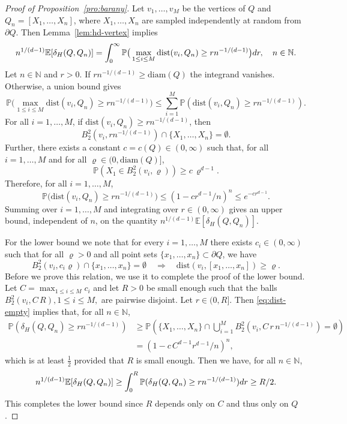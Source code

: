 \documentclass[a4paper,12pt]{article}
\theoremstyle{definition}
\newcommand{\IE}{\mathbb{E}}
\newcommand{\IN}{\mathbb{N}}
\newcommand{\IP}{\mathbb{P}}
\newcommand{\dd}{{\rm d}}
\newcommand{\dist}{\mathrm{dist}}
\newcommand{\diam}{\mathrm{diam}}
\begin{document}
\begin{proof}[Proof of Proposition~\ref{pro:barany}]
Let $v_1,\dots,v_M$ be the vertices of $Q$ and $Q_n=[X_1,\dots,X_n]$, where $X_1,\dots,X_n$ are sampled independently at random from $\partial Q$. Then Lemma~\ref{lem:hd-vertex} implies
\[
n^{1/(d-1)}\IE[\delta_H(Q,Q_n)]
=\int_0^{\infty}\IP\big(\max_{1\le i\le M}\dist(v_i,Q_n)\ge rn^{-1/(d-1)}\big)\dd r,\quad n\in\IN.
\]
Let $n\in\IN$ and $r>0$. If $rn^{-1/(d-1)}\ge \diam(Q)$ the integrand vanishes. Otherwise, a union bound gives
\[
\IP\big(\max_{1\le i\le M}\dist(v_i,Q_n)\ge rn^{-1/(d-1)}\big)
\le \sum_{i=1}^{M}\IP(\dist(v_i,Q_n)\ge rn^{-1/(d-1)}).
\]
For all $i=1,\dots,M$, if $\dist(v_i,Q_n)\ge rn^{-1/(d-1)}$, then 
  \[
    B^2_2(v_i,rn^{-1/(d-1)})\cap \{X_1,\dots,X_n\}=\emptyset.
  \] 
	Further, there exists a constant $c=c(Q)\in (0,\infty)$ such that, for all $i=1,\dots,M$ and for all $\varrho\in (0,\diam(Q)]$, 
\begin{equation} \label{eq:volume-ball}
\IP(X_1\in B^2_2(v_i,\varrho))\ge c\, \varrho^{d-1}.
\end{equation}
Therefore, for all $i=1,\dots,M$, 
\begin{equation}\label{Prop1}
\IP\big(\dist(v_{i},Q_n)\ge rn^{-1/(d-1)}\big)\le (1-cr^{d-1}/n)^n\le e^{-cr^{d-1}}.
\end{equation}
Summing over $i=1,\dots,M$ and integrating over $r\in (0,\infty)$ gives an upper bound, independent of $n$, on the quantity $n^{1/(d-1)}\IE[ \delta_H(Q,Q_n)]$.

For the lower bound we note that for every $i=1,\dots,M$ there exists $c_i\in (0,\infty)$ such that for all $\varrho>0$ and all point sets $\{x_1,\dots,x_n\}\subset \partial Q$, we have
\begin{equation} \label{eq:dist-empty}
	B^2_2(v_i,c_i \varrho)\cap \{x_1,\dots,x_n\}=\emptyset \quad \Rightarrow \quad \dist(v_i,[x_1,\dots,x_n])\ge \varrho.
\end{equation}
Before we prove this relation, we use it to complete the proof of the lower bound. Let $C=\max_{1\le i\le M}c_i$ and let $R>0$ be small enough such that the balls $B^2_2(v_i,C\, R), 1\le i\le M,$ are pairwise disjoint. Let $r\in (0,R]$. Then \eqref{eq:dist-empty} implies that, for all $n\in\IN$,
\begin{align*}
\IP(\delta_H(Q,Q_n)\ge rn^{-1/(d-1)})
&\ge \IP(\{X_1,\dots,X_n\}\cap\bigcup_{i=1}^M B^2_2(v_i,C \, r\, n^{-1/(d-1)})=\emptyset)\\
&= (1-c\, C^{d-1}r^{d-1}/n)^n,
\end{align*}
which is at least $\frac{1}{2}$ provided that $R$ is small enough. 
Then we have,  for all $n\in\IN$,
\[
n^{1/(d-1)}\IE[\delta_H(Q,Q_n)]
\ge \int_0^R \IP(\delta_H(Q,Q_n)\ge rn^{-1/(d-1)})\dd r
\ge R/2.
\]
This  completes the lower bound since $R$ depends only on $C$ and thus only on $Q$.


\end{proof}
\end{document}
